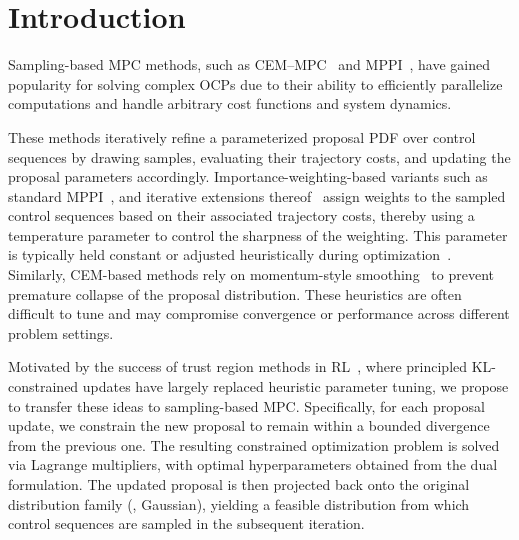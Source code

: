 
\section{Introduction}
\label{sec:intro}

Sampling-based \ac{MPC} methods, such as \ac{CEM}--\ac{MPC}~\cite{pinneriSampleefficientCrossentropyMethod2021} and \ac{MPPI}~\cite{williamsInformationtheoretic2018,kazimRecentAdvancesPath2024}, have gained popularity for solving complex \acp{OCP} due to their ability to efficiently parallelize computations and handle arbitrary cost functions and system dynamics.

These methods iteratively refine a parameterized proposal \ac{PDF} over control sequences by drawing samples, evaluating their trajectory costs, and updating the proposal parameters accordingly.
Importance-weighting-based variants such as standard \ac{MPPI}~\cite{williamsInformationtheoretic2018}, and iterative extensions thereof~\cite{bhardwajSTORMIntegratedFramework2022} assign weights to the sampled control sequences based on their associated trajectory costs, thereby using a temperature parameter to control the sharpness of the weighting. 
This parameter is typically held constant or adjusted heuristically during optimization~\cite{pezzatoSamplingbasedModelPredictive2025}.
Similarly, \ac{CEM}-based methods rely on momentum-style smoothing~\cite{rubinsteinCrossEntropy2004} to prevent premature collapse of the proposal distribution.
These heuristics are often difficult to tune and may compromise convergence or performance across different problem settings.

Motivated by the success of trust region methods in \ac{RL}~\cite{schulmanTrustRegionPolicy2015,petersRelativeEntropyPolicy2010}, where principled \ac{KL}-constrained updates have largely replaced heuristic parameter tuning, we propose to transfer these ideas to sampling-based \ac{MPC}.
Specifically, for each proposal update, we constrain the new proposal to remain within a bounded divergence from the previous one. 
The resulting constrained optimization problem is solved via Lagrange multipliers, with optimal hyperparameters obtained from the dual formulation. 
The updated proposal is then projected back onto the original distribution family (\eg, Gaussian), yielding a feasible distribution from which control sequences are sampled in the subsequent iteration.

